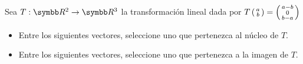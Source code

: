 \item Sea \(T: \realR^2 \rightarrow \realR^3\) la transformación lineal dada por \(T \fsmvec{a,b}=\fsmvec{a-b,0,b-a}\)
    \begin{itemize}
        \item Entre los siguientes vectores, seleccione uno que pertenezca al núcleo de \(T\).
        \item Entre los siguientes vectores, seleccione uno que pertenezca a la imagen de \(T\).
    \end{itemize}
